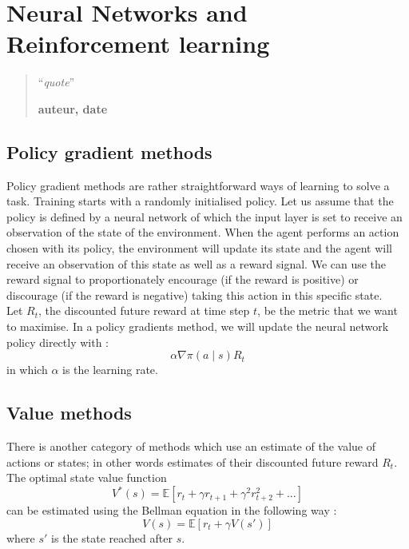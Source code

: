 \chapter{Neural Networks and Reinforcement learning}
\begin{quotation}
\noindent ``\emph{quote}''
\begin{flushright}\textbf{auteur, date}\end{flushright}
\end{quotation}

\vspace*{0.5cm}


\section{Policy gradient methods}
Policy gradient methods are rather straightforward ways of learning to solve a task.
Training starts with a randomly initialised policy. Let us assume that the
policy is defined by a neural network of which the input layer is set to 
receive an observation of the state of the environment. 
When the agent performs an action chosen with its policy, the environment will
update its state and the agent will receive an observation of this state as
well as a reward signal. We can use the reward signal to proportionately
encourage (if the reward is 
positive) or discourage (if the reward is negative) taking this action in 
this specific state. \\

Let $R_t$, the discounted future reward at time step $t$, be the metric
that we want to maximise. In a policy gradients method, we will update the
neural network policy directly with :
$$\alpha \nabla \pi(a \mid s) R_t$$
in which $\alpha$ is the learning rate.

\section{Value methods}
There is another category of methods which use an estimate of the value of
actions or states; in other words estimates of their discounted future reward
$R_t$.\\

The optimal state value function 
$$ V^*(s) = \mathbb{E}\left[ r_t + \gamma r_{t+1} + \gamma^2 r_{t+2}^2 + ...  \right]$$
can be estimated using the Bellman equation in the following way :
$$ V(s) = \mathbb{E}\left[ r_t + \gamma V(s')\right]$$
where $s'$ is the state reached after $s$.\\

